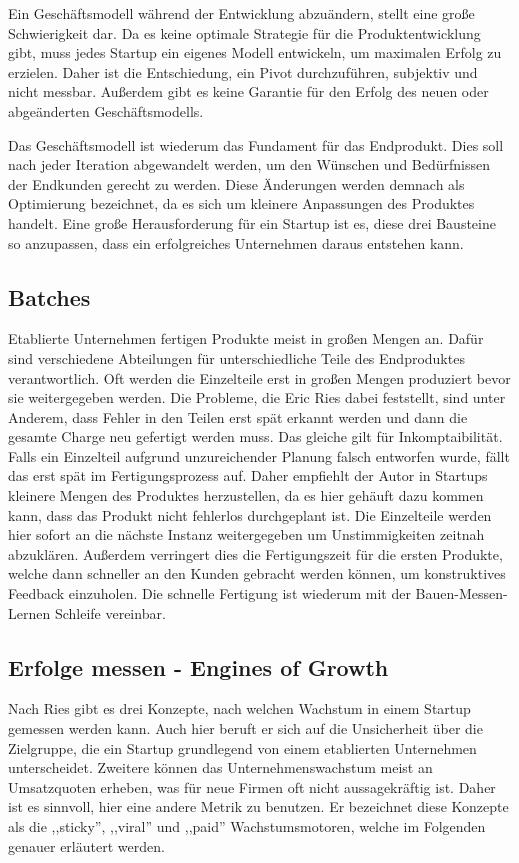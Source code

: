 Ein Geschäftsmodell während der Entwicklung abzuändern, stellt eine große Schwierigkeit dar. Da es keine optimale Strategie für die Produktentwicklung gibt, muss jedes Startup ein eigenes Modell entwickeln, um maximalen Erfolg zu erzielen. Daher ist die Entschiedung, ein Pivot durchzuführen, subjektiv und nicht messbar. Außerdem gibt es keine Garantie für den Erfolg des neuen oder abgeänderten Geschäftsmodells. 

Das Geschäftsmodell ist wiederum das Fundament für das Endprodukt. Dies soll nach jeder Iteration abgewandelt werden, um den Wünschen und Bedürfnissen der Endkunden gerecht zu werden. Diese Änderungen werden demnach als Optimierung bezeichnet, da es sich um kleinere Anpassungen des Produktes handelt. Eine große Herausforderung für ein Startup ist es, diese drei Bausteine so anzupassen, dass ein erfolgreiches Unternehmen daraus entstehen kann.

\subsection*{Batches}
Etablierte Unternehmen fertigen Produkte meist in großen Mengen an. Dafür sind verschiedene Abteilungen für unterschiedliche Teile des Endproduktes verantwortlich. Oft werden die Einzelteile erst in großen Mengen produziert bevor sie weitergegeben werden. Die Probleme, die Eric Ries dabei feststellt, sind unter Anderem, dass Fehler in den Teilen erst spät erkannt werden und dann die gesamte Charge neu gefertigt werden muss. Das gleiche gilt für Inkomptaibilität. Falls ein Einzelteil aufgrund unzureichender Planung falsch entworfen wurde, fällt das erst spät im Fertigungsprozess auf. Daher empfiehlt der Autor in Startups kleinere Mengen des Produktes herzustellen, da es hier gehäuft dazu kommen kann, dass das Produkt nicht fehlerlos durchgeplant ist. Die Einzelteile werden hier sofort an die nächste Instanz weitergegeben um Unstimmigkeiten zeitnah abzuklären. Außerdem verringert dies die Fertigungszeit für die ersten Produkte, welche dann schneller an den Kunden gebracht werden können, um konstruktives Feedback einzuholen. Die schnelle Fertigung ist wiederum mit der Bauen-Messen-Lernen Schleife vereinbar.

\subsection*{Erfolge messen - Engines of Growth}
Nach Ries gibt es drei Konzepte, nach welchen Wachstum in einem Startup gemessen werden kann. Auch hier beruft er sich auf die Unsicherheit über die Zielgruppe, die ein Startup grundlegend von einem etablierten Unternehmen unterscheidet. Zweitere können das Unternehmenswachstum meist an Umsatzquoten erheben, was für neue Firmen oft nicht aussagekräftig ist. Daher ist es sinnvoll, hier eine andere Metrik zu benutzen. Er bezeichnet diese Konzepte als die ,,sticky'', ,,viral'' und ,,paid'' Wachstumsmotoren, welche im Folgenden genauer erläutert werden.

